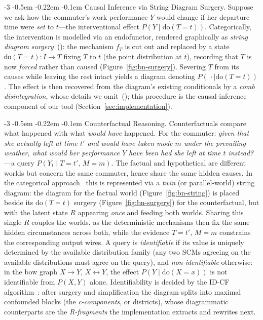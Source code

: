 \documentclass[runningheads]{llncs}
\makeatletter
\renewcommand\paragraph{\@startsection{paragraph}{4}{\z@}%
                       {-3\p@ \@plus -2\p@ \@minus -2\p@}%
                       {-0.5em \@plus -0.22em \@minus -0.1em}%
                       {\normalfont\normalsize\bfseries}}
\makeatother
\begin{document}
\paragraph{Causal Inference via String Diagram Surgery.}
Suppose we ask how the commuter's work performance $Y$ would change if her departure time were \emph{set} to $t$---the interventional effect $P(Y \mid \mathrm{do}(T{=}t))$. Categorically, the intervention is modelled via an endofunctor, rendered graphically as \emph{string diagram surgery}~(\cite{jacobs2021causal,jacobs2019causal,lorenz2023causal}): the mechanism $f_T$ is cut out and replaced by a state $\mathsf{do}(T{=}t):I\to T$ fixing $T$ to $t$ (the point distribution at $t$), recording that $T$ is now \emph{forced} rather than caused (Figure~\ref{fig:bn-surgery}). Severing $T$ from its causes while leaving the rest intact yields a diagram denoting $P(\,\cdot\mid\mathrm{do}(T{=}t))$. The effect is then recovered from the diagram's existing conditionals by a \emph{comb disintegration}, whose details we omit~(\cite{jacobs2021causal}); this procedure is the causal-inference component of our tool (Section~\ref{sec:implementation}).

\paragraph{Counterfactual Reasoning.}
Counterfactuals compare what happened with what \emph{would have} happened. For the commuter: \emph{given that she actually left at time $t'$ and would have taken mode $m$ under the prevailing weather, what would her performance $Y$ have been had she left at time $t$ instead?}---a query $P(Y_t \mid T{=}t',\,M{=}m)$. The factual and hypothetical are different worlds but concern the same commuter, hence share the same hidden causes. In the categorical approach~\cite{jacobs2021causal} this is represented via a \emph{twin} (or parallel-world) string diagram: the diagram for the factual world (Figure~\ref{fig:bn-string}) is placed beside its $\mathrm{do}(T{=}t)$ surgery (Figure~\ref{fig:bn-surgery}) for the counterfactual, but with the latent state $R$ appearing \emph{once} and feeding both worlds. Sharing this single $R$ couples the worlds, as the deterministic mechanisms then fix the same hidden circumstances across both, while the evidence $T{=}t'$, $M{=}m$ constrains the corresponding output wires. A query is \emph{identifiable} if its value is uniquely determined by the available distribution family (any two SCMs agreeing on the available distributions must agree on the query), and \emph{non-identifiable} otherwise: in the bow graph $X\to Y$, $X\leftrightarrow Y$, the effect $P(Y\mid\mathrm{do}(X{=}x))$ is not identifiable from $P(X,Y)$ alone. Identifiability is decided by the ID-CF algorithm~\cite{shpitser2008complete}: after surgery and simplification the diagram splits into maximal confounded blocks (the \emph{c-components}, or districts), whose diagrammatic counterparts are the \emph{R-fragments} the implementation extracts and rewrites next.
\end{document}
